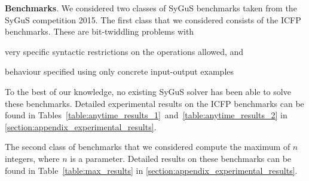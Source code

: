 \documentclass{llncs}
\newcommand\comment[1]{}
\newcommand{\sygus}{{\sffamily\fontsize{8.5}{10}\selectfont
    SyGuS}\xspace}
\newcommand{\dcsolve}{{\sffamily\fontsize{8.5}{10}\selectfont
    DCSolve}\xspace}
\renewcommand{\paragraph}[1]{\par\noindent\textbf{#1}.}
\newcommand{\esolver}{\textsc{esolver}\xspace}
\begin{document}
\paragraph{Benchmarks}
We considered two classes of \sygus benchmarks taken from the \sygus
competition 2015.
The first class that we considered consists of the ICFP
benchmarks. These are bit-twiddling problems with
\begin{inparaenum}[(a)]
\item very specific syntactic restrictions on the operations allowed,
  and
\item behaviour specified using only concrete input-output examples
\end{inparaenum}
To the best of our knowledge, no existing \sygus solver has been able to
solve these benchmarks. Detailed experimental results on the ICFP
benchmarks can be found in
Tables~\ref{table:anytime_results_1}~and~\ref{table:anytime_results_2}
in \ref{section:appendix_experimental_results}.

The second class of benchmarks that we considered compute the
maximum of $n$ integers, where $n$ is a
parameter. Detailed results on these benchmarks can be found in
Table~\ref{table:max_results} in \ref{section:appendix_experimental_results}.

\comment{
One can broadly categorize the existing \sygus solvers into two
categories:\begin{inparaenum}[(a)]
\item
\emph{Black-box solvers}, which do not leverage the correctness
specification to guide the search for solutions. Some examples are
\esolver and the stochastic solver~\cite{udupa-sygus}, as well as the
\dcsolve algorithm.
\emph{White-box solvers}, which actively leverage the correctness
specification to generate terms and predicates for solutions. Examples
for white-box solvers include the solvers based on the \textsc{stun}
algorithms~\cite{alur-15}, and the CVC4 solver~\cite{reynolds-15}.
\end{inparaenum}
}
\end{document}
